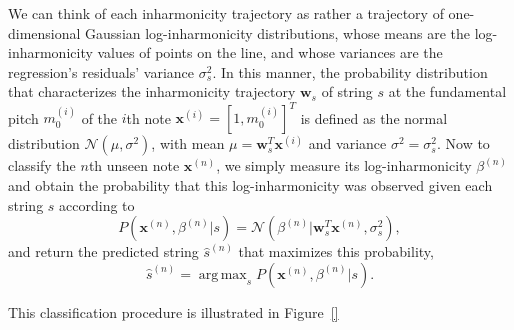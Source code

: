 \documentclass[12pt]{cmuthesis}
\DeclareMathOperator*{\argmax}{arg\,max}
\begin{document}
We can think of each inharmonicity trajectory as rather a trajectory of one-dimensional Gaussian log-inharmonicity distributions, whose means are the log-inharmonicity values of points on the line, and whose variances are the regression's residuals' variance $\sigma_s^2$. In this manner, the probability distribution that characterizes the inharmonicity trajectory $\mathbf{w}_s$ of string $s$ at the fundamental pitch $m_0^{(i)}$ of the $i$th note $\mathbf{x}^{(i)} = [1,m_0^{(i)}]^T$ is defined as the normal distribution $\mathcal{N}(\mu, \sigma^2)$, with mean $\mu = \mathbf{w}_s^T\mathbf{x}^{(i)}$ and variance $\sigma^2 = \sigma_s^2$. Now to classify the $n$th unseen note $\mathbf{x}^{(n)}$, we simply measure its log-inharmonicity $\beta^{(n)}$ and obtain the probability that this log-inharmonicity was observed given each string $s$ according to
\begin{equation}
P(\mathbf{x}^{(n)},\beta^{(n)} | s) = \mathcal{N}(\beta^{(n)} | \mathbf{w}_s^T\mathbf{x}^{(n)},\sigma_s^2),
\end{equation}
and return the predicted string $\hat{s}^{(n)}$ that maximizes this probability,
\begin{equation}
\hat{s}^{(n)} = \argmax_{s}P(\mathbf{x}^{(n)},\beta^{(n)} | s).
\label{eq:string-argmax}
\end{equation}

This classification procedure is illustrated in Figure~\ref{}

 


\end{document}
